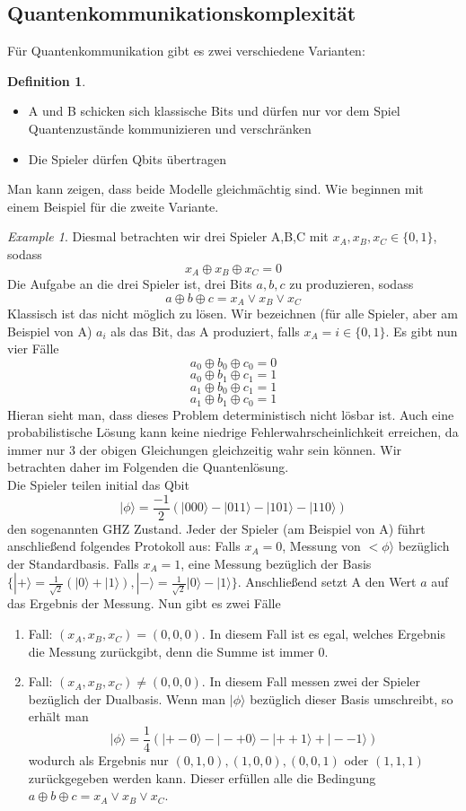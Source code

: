 \documentclass[a4paper, 12pt]{article}
\theoremstyle{plain}
\theoremstyle{definition}
\newtheorem{definition}[theorem]{Definition} %
\theoremstyle{lemma}
\theoremstyle{remark}
\theoremstyle{example}
\newtheorem{example}[theorem]{Example}
\begin{document}
	\subsection{Quantenkommunikationskomplexität}
	Für Quantenkommunikation gibt es zwei verschiedene Varianten: \begin{definition}
		\begin{itemize}
			\item A und B schicken sich klassische Bits und dürfen nur vor dem Spiel Quantenzustände kommunizieren und verschränken
			\item Die Spieler dürfen Qbits übertragen
		\end{itemize}
	\end{definition}
	Man kann zeigen, dass beide Modelle gleichmächtig sind. Wie beginnen mit einem Beispiel für die zweite Variante.
	\begin{example}
		Diesmal betrachten wir drei Spieler A,B,C mit $x_A, x_B, x_C \in \{0,1\}$, sodass \[x_A \oplus x_B \oplus x_C = 0\] Die Aufgabe an die drei Spieler ist, drei Bits $a,b,c$ zu produzieren, sodass \[a\oplus b\oplus c = x_A \lor x_B \lor x_C\] Klassisch ist das nicht möglich zu lösen. Wir bezeichnen (für alle Spieler, aber am Beispiel von A) $a_i$ als das Bit, das A produziert, falls $x_A = i \in \{0,1\}$. Es gibt nun vier Fälle \[a_0 \oplus b_0 \oplus c_0 = 0\]
		\[a_0 \oplus b_1 \oplus c_1 = 1\] \[a_1 \oplus b_0 \oplus c_1 = 1\] \[a_1 \oplus b_1 \oplus c_0 = 1\] Hieran sieht man, dass dieses Problem deterministisch nicht lösbar ist. Auch eine probabilistische Lösung kann keine niedrige Fehlerwahrscheinlichkeit erreichen, da immer nur 3 der obigen Gleichungen gleichzeitig wahr sein können. Wir betrachten daher im Folgenden die Quantenlösung.\\
		Die Spieler teilen initial das Qbit \[|\phi\rangle = \frac{-1}{2}(|000\rangle - |011\rangle - |101\rangle - |110\rangle)\] den sogenannten GHZ Zustand. Jeder der Spieler (am Beispiel von A) führt anschließend folgendes Protokoll aus: Falls $x_A = 0$, Messung von $<\phi\rangle$ bezüglich der Standardbasis. Falls $x_A = 1$, eine Messung bezüglich der Basis $\{|+\rangle = \frac{1}{\sqrt{2}}(|0\rangle+|1\rangle), |-\rangle = \frac{1}{\sqrt{2}} |0\rangle-|1\rangle\}$. Anschließend setzt A den Wert $a$ auf das Ergebnis der Messung. Nun gibt es zwei Fälle \begin{enumerate}
			\item Fall: $(x_A,x_B,x_C) = (0,0,0)$. In diesem Fall ist es egal, welches Ergebnis die Messung zurückgibt, denn die Summe ist immer 0.
			\item Fall: $(x_A,x_B,x_C) \neq (0,0,0)$. In diesem Fall messen zwei der Spieler bezüglich der Dualbasis. Wenn man $|\phi\rangle$ bezüglich dieser Basis umschreibt, so erhält man \[|\phi\rangle = \frac{1}{4}(|+-0\rangle - |-+0\rangle - |++1\rangle + |--1\rangle)\]
			wodurch als Ergebnis nur $(0,1,0), (1,0,0), (0,0,1)$ oder $(1,1,1)$ zurückgegeben werden kann. Dieser erfüllen alle die Bedingung $a\oplus b\oplus c = x_A\lor x_B\lor x_C$.
		\end{enumerate}
	\end{example}
\end{document}
